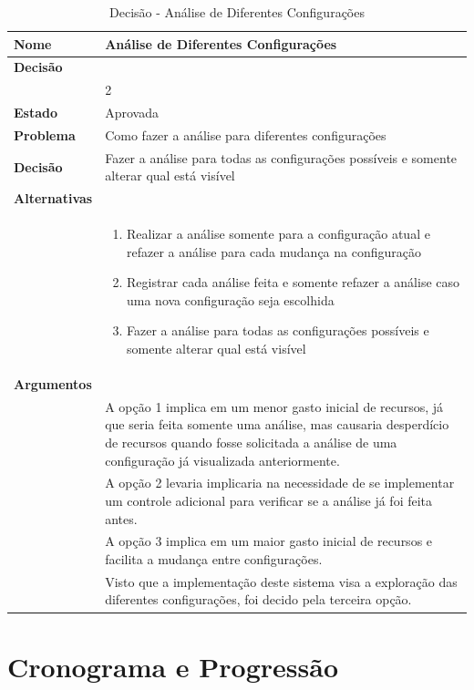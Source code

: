 \documentclass[12pt]{article}
\begin{document}
\begin{table}[H]
	\centering
	\caption{Decisão - Análise de Diferentes Configurações}
	\begin{tabular}{p{3cm} p{11cm}}
		\textbf{Nome}		&	Análise de Diferentes Configurações \\
		\toprule
		\textbf{Decisão}	&   \\
							& 2 \\
		\toprule
		\midrule
		\textbf{Estado}		& Aprovada \\
		\midrule
		\textbf{Problema}	& Como fazer a análise para diferentes configurações \\
		\midrule
		\textbf{Decisão}	& Fazer a análise para todas as configurações possíveis e somente alterar qual está visível\\
		\midrule
		\textbf{Alternativas} & \\
		& \begin{enumerate}
			\item Realizar a análise somente para a configuração atual e refazer a análise para cada mudança na configuração
			\item Registrar cada análise feita e somente refazer a análise caso uma nova configuração seja escolhida
			\item Fazer a análise para todas as configurações possíveis e somente alterar qual está visível
		\end{enumerate} \\
		\midrule
		\textbf{Argumentos} & \\
		& A opção 1 implica em um menor gasto inicial de recursos, já que seria feita somente uma análise, mas causaria desperdício de recursos quando fosse solicitada a análise de uma configuração já visualizada anteriormente. \\
		& A opção 2 levaria implicaria na necessidade de se implementar um controle adicional para verificar se a análise já foi feita antes. \\
		& A opção 3 implica em um maior gasto inicial de recursos e facilita a mudança entre configurações. \\
		& Visto que a implementação deste sistema visa a exploração das diferentes configurações, foi decido pela terceira opção. \\
		\bottomrule
	\end{tabular}		
\end{table}

\endgroup

\newpage

\section{Cronograma e Progressão}
\end{document}

